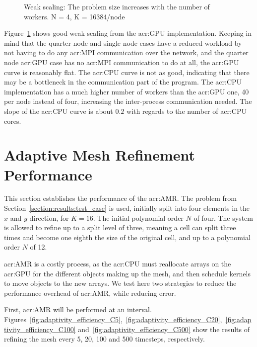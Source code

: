 \begin{figure}[H]
	\centering
	
	\caption{Weak scaling: The problem size increases with the number of workers. N = 4, K = 16384/node}\label{fig:weak_scaling}
\end{figure}

Figure~\ref{fig:weak_scaling} shows good weak scaling from the \acrshort{acr:GPU} implementation.
Keeping in mind that the quarter node and single node cases have a reduced workload by not having to
do any \acrshort{acr:MPI} communication over the network, and the quarter node \acrshort{acr:GPU}
case has no \acrshort{acr:MPI} communication to do at all, the \acrshort{acr:GPU} curve is
reasonably flat. The \acrshort{acr:CPU} curve is not as good, indicating that there may be a
bottleneck in the communication part of the program. The \acrshort{acr:CPU} implementation has a
much higher number of workers than the \acrshort{acr:GPU} one, 40 per node instead of four,
increasing the inter-process communication needed. The slope of the \acrshort{acr:CPU} curve is
about \(0.2\) with regards to the number of \acrshort{acr:CPU} cores. 

\section{Adaptive Mesh Refinement Performance}\label{section:results:adaptivity_performance}

This section establishes the performance of the \acrlong{acr:AMR}. The problem from
Section~\ref{section:results:test_case} is used, initially split into four elements in the \(x\) and
\(y\) direction, for \(K = 16\). The initial polynomial order \(N\) of four. The system is allowed
to refine up to a split level of three, meaning a cell can split three times and become one eighth
the size of the original cell, and up to a polynomial order \(N\) of 12.

\Acrlong{acr:AMR} is a costly process, as the \acrshort{acr:CPU} must reallocate arrays on the
\acrshort{acr:GPU} for the different objects making up the mesh, and then schedule kernels to move
objects to the new arrays. We test here two strategies to reduce the performance overhead of
\acrlong{acr:AMR}, while reducing error. 

First, \acrlong{acr:AMR} will be performed at an interval.
Figures~\ref{fig:adaptivity_efficiency_C5},~\ref{fig:adaptivity_efficiency_C20},~\ref{fig:adaptivity_efficiency_C100}
and~\ref{fig:adaptivity_efficiency_C500} show the results of refining the mesh every 5, 20, 100 and
500 timesteps, respectively.

